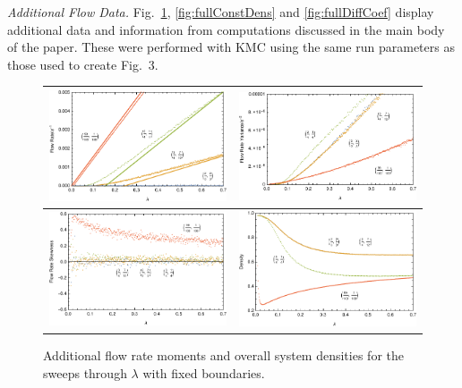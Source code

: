 \documentclass[
reprint,
 amsmath,amssymb,
 aps,
 prl,
]{revtex4-1}
\begin{document}
\textit{Additional Flow Data.} Fig.~\ref{fig:fullLambdaScans}, \ref{fig:fullConstDens} and \ref{fig:fullDiffCoef} display additional data and information from computations discussed in the main body of the paper. These were performed with KMC using the same run parameters as those used to create Fig.~3. 
\begin{figure}[h!]
\vspace{1em}
\caption{\label{fig:fullLambdaScans} Additional flow rate moments and overall system densities for the sweeps through $\lambda$ with fixed boundaries.}
\begin{center}
 \begin{tabular}{c|c}
    \includegraphics[width=0.5\linewidth]{newFlowMean} & \includegraphics[width=0.5\linewidth]{newFlowVar} \\
    \hline
    \includegraphics[width=0.5\linewidth]{newFlowSkew} & \includegraphics[width=0.5\linewidth]{newDens} \\
    \end{tabular}
\end{center}
    \vspace{-0em}
\end{figure}
\end{document}

